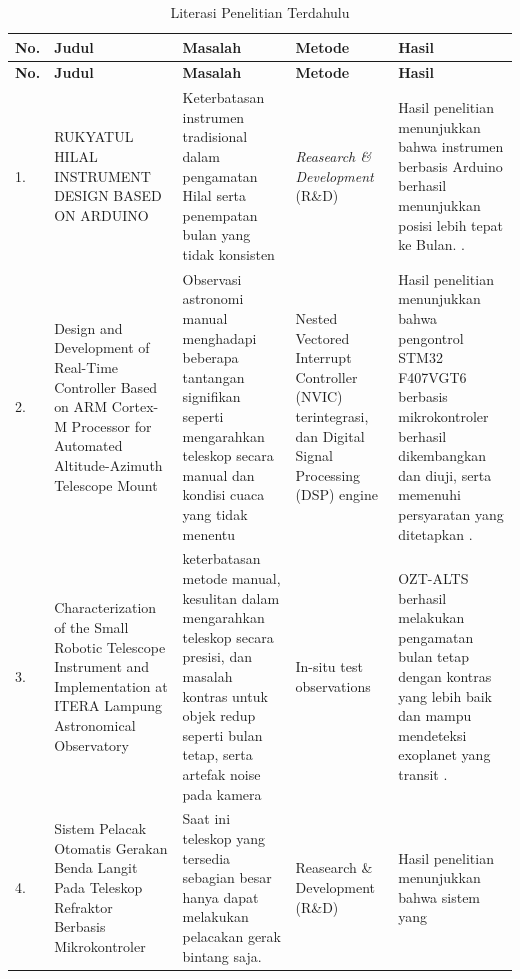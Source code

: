 \begin{longtable}{| b{}|p{}|p{}|p{}|p{}|} %
	\caption{Literasi Penelitian Terdahulu}
	\label{table:2.literasi}\\
	\hline
	\textbf{No.} & \textbf{Judul} & \textbf{Masalah} & \textbf{Metode} & \textbf{Hasil} \\
	\hline
	\endfirsthead %
	\hline
	\textbf{No.} & \textbf{Judul} & \textbf{Masalah} & \textbf{Metode} & \textbf{Hasil} \\
	\hline
	\endhead %
	1.  & RUKYATUL HILAL INSTRUMENT DESIGN BASED ON ARDUINO  & Keterbatasan instrumen tradisional dalam pengamatan Hilal serta penempatan bulan yang tidak konsisten & \textit{Reasearch \& Development} (R\&D) & Hasil penelitian menunjukkan bahwa instrumen berbasis Arduino berhasil menunjukkan posisi lebih tepat ke Bulan. \cite{Hadi2022}.\\ 
	\hline
	2. & Design and Development of Real-Time Controller Based on ARM Cortex-M Processor
	for Automated Altitude-Azimuth Telescope Mount & Observasi astronomi manual menghadapi beberapa tantangan signifikan seperti mengarahkan teleskop secara manual dan kondisi cuaca yang tidak menentu & Nested Vectored Interrupt Controller (NVIC) terintegrasi, dan Digital Signal Processing (DSP) engine & Hasil penelitian menunjukkan bahwa pengontrol STM32 F407VGT6 berbasis mikrokontroler berhasil dikembangkan dan diuji, serta memenuhi persyaratan yang ditetapkan \cite{Rangana2022}.\\ 
	\hline
	3. & Characterization of the Small Robotic Telescope Instrument and Implementation at ITERA Lampung Astronomical Observatory & keterbatasan metode manual, kesulitan dalam mengarahkan teleskop secara presisi, dan masalah kontras untuk objek redup seperti bulan tetap, serta artefak noise pada kamera & In-situ test observations & OZT-ALTS berhasil melakukan pengamatan bulan tetap dengan kontras yang lebih baik dan mampu mendeteksi exoplanet yang transit \cite{Malasan2025}.\\ 
	\hline
	4. & Sistem Pelacak Otomatis Gerakan Benda Langit Pada Teleskop Refraktor Berbasis Mikrokontroler & Saat ini teleskop yang tersedia sebagian besar hanya dapat melakukan pelacakan gerak bintang saja. & Reasearch \& Development (R\&D) & Hasil penelitian menunjukkan bahwa sistem yang

\end{longtable}
